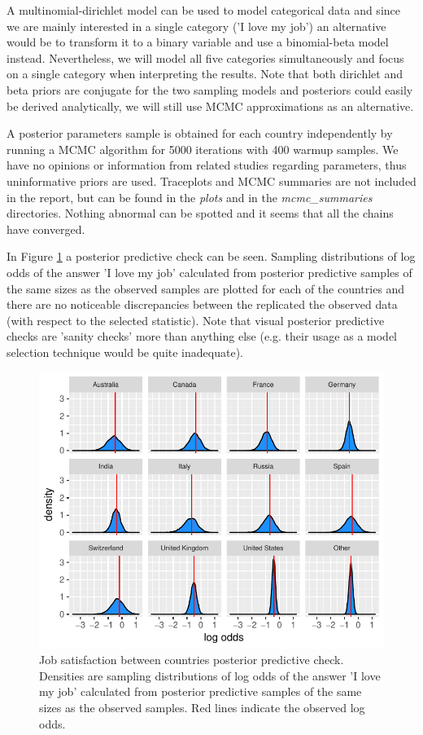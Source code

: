 \documentclass{article}
\begin{document}
A multinomial-dirichlet model can be used to model categorical data and since we are mainly interested in a single category ('I love my job') an alternative would be to transform it to a binary variable and use a binomial-beta model instead. Nevertheless, we will model all five categories simultaneously and focus on a single category when interpreting the results. Note that both dirichlet and beta priors are conjugate for the two sampling models and posteriors could easily be derived analytically, we will still use MCMC approximations as an alternative.

A posterior parameters sample is obtained for each country independently by running a MCMC algorithm for 5000 iterations with 400 warmup samples. We have no opinions or information from related studies regarding parameters, thus uninformative priors are used. Traceplots and MCMC summaries are not included in the report, but can be found in the \textit{plots} and in the \textit{mcmc\_summaries} directories. Nothing abnormal can be spotted and it seems that all the chains have converged.

In Figure \ref{fig_1} a posterior predictive check can be seen. Sampling distributions of log odds of the answer 'I love my job' calculated from posterior predictive samples of the same sizes as the observed samples are plotted for each of the countries and there are no noticeable discrepancies between the replicated the observed data (with respect to the selected statistic). Note that visual posterior predictive checks are 'sanity checks' more than anything else (e.g. their usage as a model selection technique would be quite inadequate).





\begin{figure}[H]
\centering
\includegraphics{report-010}
\caption{Job satisfaction between countries posterior predictive check. Densities are sampling distributions of log odds of the answer 'I love my job' calculated from posterior predictive samples of the same sizes as the observed samples. Red lines indicate the observed log odds.}\label{fig_1}
\end{figure}
\end{document}
